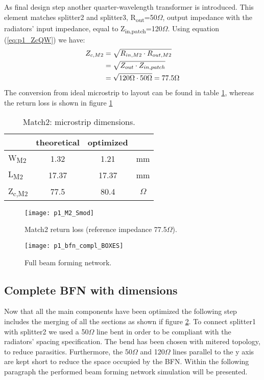 As final design step another quarter-wavelength transformer is introduced. This element matches splitter2 and splitter3, R\textsubscript{out}=50$\Omega$, output impedance with the radiators' input impedance, equal to Z\textsubscript{in,patch}=120$\Omega$. Using equation (\ref{eq:p1_ZcQW}) we have:
\begin{align}
	Z_{c,M2}&=\sqrt{R_{in,M2}\cdot R_{out,M2}} \notag\\
	&=\sqrt{Z_{out}\cdot Z_{in,patch}} \notag\\
	&=\sqrt{120\Omega \cdot 50\Omega}=77.5\Omega \notag
\end{align}
The conversion from ideal microstrip to layout can be found in table \ref{tab:21_DimM2}, whereas the return loss is shown in figure \ref{fig:p1_M2_Smod}

\begin{table} [H]
	\label{tab:21_DimM2}
	\caption{Match2: microstrip dimensions.}
	\centering	
	\begin{tabular}{lccc} 
		\toprule
		& theoretical 			& optimized &\\
		\midrule 
		W\textsubscript{M2} 	&	1.32		&	1.21	& mm 		\\
		L\textsubscript{M2}		&	17.37		& 	17.37	& mm		\\ 
		Z\textsubscript{c,M2}	&	77.5		& 	80.4	& $\Omega$		\\
		\bottomrule
	\end{tabular}	
\end{table}

\begin{figure}[t] 
	\centering
	\texttt{[image: p1\_M2\_Smod]}
	\caption{Match2 return loss (reference impedance 77.5$\Omega$). }
	\label{fig:p1_M2_Smod}
\end{figure}
\newpage
\begin{figure}[H] 
	\centering
	\texttt{[image: p1\_bfn\_compl\_BOXES]}
	\caption{Full beam forming network. }
	\label{fig:p1_bfn_compl1}
\end{figure}

\newpage

\subsection{Complete BFN with dimensions}

Now that all the main components have been optimized the following step includes the merging of all the sections as shown if figure \ref{fig:p1_bfn_compl1}.
To connect splitter1 with splitter2 we used a 50$\Omega$ line bent in order to be compliant with the radiators' spacing specification. The bend has been chosen with mitered topology, to reduce parasitics. Furthermore, the 50$\Omega$ and 120$\Omega$ lines parallel to the y axis are kept short to reduce the space occupied by the BFN. Within the following paragraph the performed beam forming network simulation will be presented.

